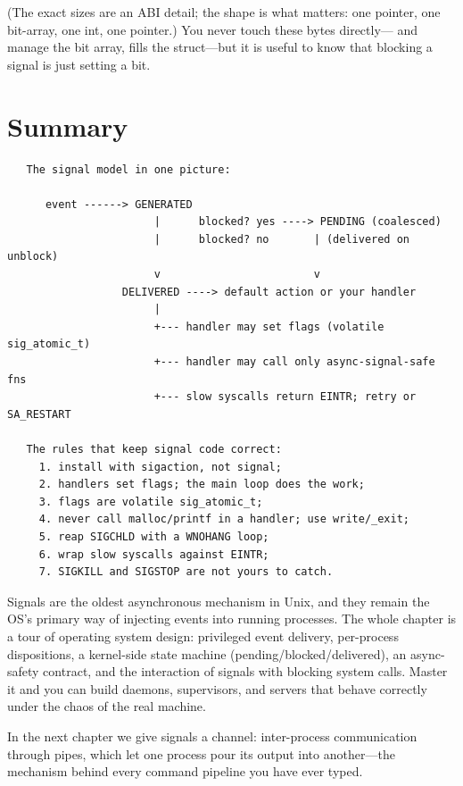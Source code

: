 (The exact sizes are an ABI detail; the shape is what matters: one
pointer, one bit-array, one int, one pointer.) You never touch these
bytes directly--- and  manage the
bit array,  fills the struct---but it is useful to
know that blocking a signal is just setting a bit.

\section{Summary}

\begin{verbatim}
   The signal model in one picture:

      event ------> GENERATED
                       |      blocked? yes ----> PENDING (coalesced)
                       |      blocked? no       | (delivered on unblock)
                       v                        v
                  DELIVERED ----> default action or your handler
                       |
                       +--- handler may set flags (volatile sig_atomic_t)
                       +--- handler may call only async-signal-safe fns
                       +--- slow syscalls return EINTR; retry or SA_RESTART

   The rules that keep signal code correct:
     1. install with sigaction, not signal;
     2. handlers set flags; the main loop does the work;
     3. flags are volatile sig_atomic_t;
     4. never call malloc/printf in a handler; use write/_exit;
     5. reap SIGCHLD with a WNOHANG loop;
     6. wrap slow syscalls against EINTR;
     7. SIGKILL and SIGSTOP are not yours to catch.
\end{verbatim}

\begin{osconcept}
Signals are the oldest asynchronous mechanism in Unix, and they remain
the OS's primary way of injecting events into running processes. The
whole chapter is a tour of operating system design: privileged event
delivery, per-process dispositions, a kernel-side state machine
(pending/blocked/delivered), an async-safety contract, and the
interaction of signals with blocking system calls. Master it and you
can build daemons, supervisors, and servers that behave correctly under
the chaos of the real machine.
\end{osconcept}

In the next chapter we give signals a channel: inter-process
communication through pipes, which let one process pour its output into
another---the mechanism behind every command pipeline you have ever
typed.


